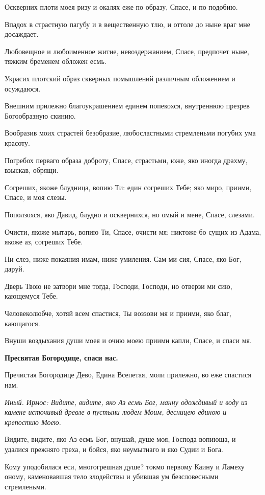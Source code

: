 Оскверних плоти моея ризу и окалях еже по образу, Спасе, и по подобию.


Впадох в страстную пагубу и в вещественную тлю, и оттоле до ныне враг мне досаждает.


Любовещное и любоименное житие, невоздержанием, Спасе, предпочет ныне, тяжким бременем обложен есмь.


Украсих плотский образ скверных помышлений различным обложением и осуждаюся.


Внешним прилежно благоукрашением единем попекохся, внутреннюю презрев Богообразную скинию.


Вообразив моих страстей безобразие, любосластными стремленьми погубих ума красоту.


Погребох перваго образа доброту, Спасе, страстьми, юже, яко иногда драхму, взыскав, обрящи.


Согреших, якоже блудница, вопию Ти: един согреших Тебе; яко миро, приими, Спасе, и моя слезы.


Поползохся, яко Давид, блудно и осквернихся, но омый и мене, Спасе, слезами.


Очисти, якоже мытарь, вопию Ти, Спасе, очисти мя: никтоже бо сущих из Адама, якоже аз, согреших Тебе.


Ни слез, ниже покаяния имам, ниже умиления. Сам ми сия, Спасе, яко Бог, даруй.


Дверь Твою не затвори мне тогда, Господи, Господи, но отверзи ми сию, кающемуся Тебе.


Человеколюбче, хотяй всем спастися, Ты воззови мя и приими, яко благ, кающагося.


Внуши воздыхания души моея и очию моею приими капли, Спасе, и спаси мя.


\bfseries Пресвятая Богородице, спаси нас.


\normalfont{}


Пречистая Богородице Дево, Едина Всепетая, моли прилежно, во еже спастися нам.


\itshape Иный. Ирмос\normalfont{}: Видите, видите, яко Аз есмь Бог, манну одождивый и воду из камене источивый древле в пустыни людем Моим, десницею единою и крепостию Моею.


Видите, видите, яко Аз есмь Бог, внушай, душе моя, Господа вопиюща, и удалися прежняго греха, и бойся, яко неумытнаго и яко Судии и Бога.


Кому уподобилася еси, многогрешная душе? токмо первому Каину и Ламеху оному, каменовавшая тело злодействы и убившая ум безсловесными стремленьми.


